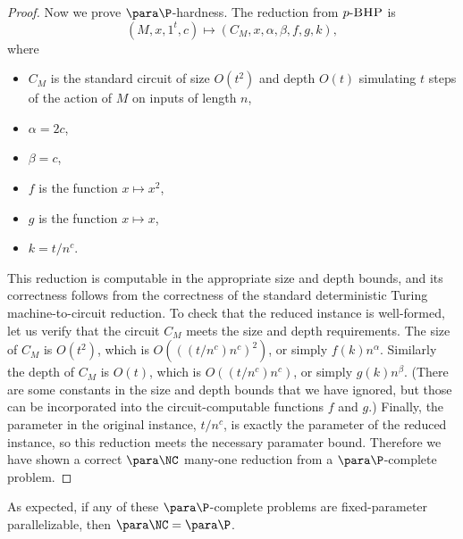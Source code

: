 \documentclass{article}
\newcommand{\dash}{\textnormal{-}}
\newcommand{\pBHP}{p \dash \textsc{BHP}}
\newcommand{\pSCE}{p \dash \textsc{SCE}}
\begin{document}
\begin{proof}

  Now we prove $\para \P$-hardness.
  The reduction from $\pBHP$ is
  \[
  (M, x, 1^t, c) \mapsto (C_M, x, \alpha, \beta, f, g, k),
  \]
  where
  \begin{itemize}
  \item $C_M$ is the standard circuit of size $O(t^2)$ and depth $O(t)$ simulating $t$ steps of the action of $M$ on inputs of length $n$,
  \item $\alpha = 2c$,
  \item $\beta = c$,
  \item $f$ is the function $x \mapsto x^2$,
  \item $g$ is the function $x \mapsto x$,
  \item $k = t / n^c$.
  \end{itemize}
  This reduction is computable in the appropriate size and depth bounds, and its correctness follows from the correctness of the standard deterministic Turing machine-to-circuit reduction.
  To check that the reduced instance is well-formed, let us verify that the circuit $C_M$ meets the size and depth requirements.
  The size of $C_M$ is $O(t^2)$, which is $O(((t / n^c) n^c)^2)$, or simply $f(k) n^\alpha$.
  Similarly the depth of $C_M$ is $O(t)$, which is $O((t / n^c) n^c)$, or simply $g(k) n^\beta$.
  (There are some constants in the size and depth bounds that we have ignored, but those can be incorporated into the circuit-computable functions $f$ and $g$.)
  Finally, the parameter in the original instance, $t / n^c$, is exactly the parameter of the reduced instance, so this reduction meets the necessary paramater bound.
  Therefore we have shown a correct $\para \NC$ many-one reduction from a $\para \P$-complete problem.
\end{proof}

As expected, if any of these $\para \P$-complete problems are fixed-parameter parallelizable, then $\para \NC = \para \P$.
\end{document}
